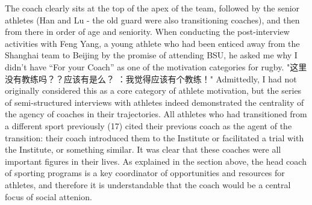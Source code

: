 





The coach clearly sits at the top of the apex of the team, followed by the senior athletes (Han and Lu - the old guard were also transitioning coaches), and then from there in order of age and seniority.  When conducting the post-interview activities with Feng Yang, a young athlete who had been enticed away from the Shanghai team to Beijing by the promise of attending BSU, he asked me why I didn't have ``For your Coach'' as one of the motivation categories for rugby.
"这里没有教练吗？？应该有是么？
：我觉得应该有个教练！"
Admittedly, I had not originally considered this as a core category of athlete motivation, but the series of semi-structured interviews with athletes indeed demonstrated the centrality of the agency of coaches in their trajectories.  All athletes who had transitioned from a different sport previously (17) cited their previous coach as the agent of the transition: their coach introduced them to the Institute or facilitated a trial with the Institute, or something similar.  It was clear that these coaches were all important figures in their lives. As explained in the section above, the head coach of sporting programs is a key coordinator of opportunities and resources for athletes, and therefore it is understandable that the coach would be a central focus of social attenion.

